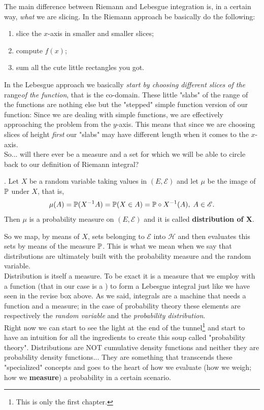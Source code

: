 \documentclass{report}
\begin{document}
The main difference between Riemann and Lebesgue integration is, in a certain way, \textit{what} we are slicing. In the Riemann approach be basically do the following:
\begin{enumerate}
	\item slice the $x$-axis in smaller and smaller slices;
	\item compute $f(x)$;
	\item sum all the cute little rectangles you got.
\end{enumerate}
In the Lebesgue approach we basically \textit{start by choosing different slices of the }range\textit{of the function}, that is the co-domain. These little "slabs" of the range of the functions are nothing else but the "stepped" simple function version of our function:
Since we are dealing with simple functions, we are effectively approaching the problem from the $y$-axis. This means that since we are choosing slices of height \textit{first} our "slabs" may have different length when it comes to the $x$-axis. \\
	So... will there ever be a measure and a set for which we will be able to circle back to our definition of Riemann integral?\par
\begin{definition}
	. Let $X$ be a random variable taking values in $(E,\mathscr{E})$ and let $\mu$ be the image of $\mathbb{P}$ under $X$, that is,
	\[\mu(A)=\mathbb{P}(X^{-1}A)=\mathbb{P}(X\in A)=\mathbb{P}\circ X^{-1}(A),\;A\in\mathscr{E}.\] Then $\mu$ is a probability measure on $(E,\mathscr{E})$ and it is called \textbf{distribution of X}.
\end{definition}
So we map, by means of $X$, sets belonging to $\mathscr{E}$ into $\mathscr{H}$ and then evaluates this sets by means of the measure $\mathbb{P}$. This is what we mean when we say that distributions are ultimately built with the probability measure and the random variable. \\
Distribution is itself a measure. To be exact it is a measure that we employ with a function (that in our case is a \rv{}) to form a Lebesgue integral just like we have seen in the revise box above. As we said, integrals are a machine that needs a function and a measure;
 in the case of probability theory these elements are respectively the \emph{random variable} and the \emph{probability distribution}.\\
 Right now we can start to see the light at the end of the tunnel\footnote{This is only the first chapter.} and start to have an intuition for all the ingredients to create this soup called "probability theory". Distributions are NOT cumulative density functions and neither they are probability density functions... They are something that transcends these "specialized" concepts and goes to the heart of how we evaluate (how we weigh; how we \textbf{measure}) a probability in a certain scenario. 
\end{document}
